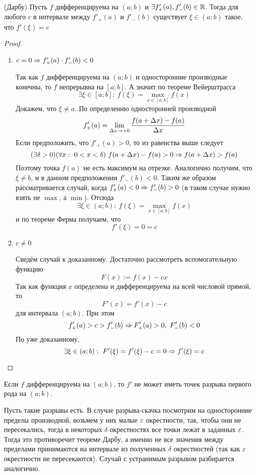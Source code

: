 \begin{theorem} (Дарбу)
	Пусть $f$ дифференцируема на $(a; b)$ и
	$\exists f'_+(a), f'_-(b) \in \mathbb{R}$. Тогда для любого
	$c$ в интервале между $f'_+(a)$ и $f'_-(b)$ существует
	$\xi \in (a; b)$ такое, что $f'(\xi) = c$
\end{theorem}

\begin{proof}~
	\begin{enumerate}
		\item $c = 0 \Rightarrow f'_+(a) \cdot f'_-(b) < 0$
		
		Так как $f$ дифференцируема на $(a; b)$ и
		односторонние производные конечны, то $f$
		непрерывна на $[a; b]$. А значит по теореме Вейерштрасса
		\[
			\exists \xi \in [a; b] :\ f(\xi) =
			\max\limits_{x \in [a; b]} f(x)
		\]
		Докажем, что $\xi \neq a$. По определению
		односторонней производной
		\[
			f'_+(a) = \lim\limits_{\Delta x \to +0}
			\frac{f(a + \Delta x) - f(a)}{\Delta x}
		\]
		Если предположить, что $f'_+(a) > 0$, то из равенства выше следует
		\[
			(\exists \delta > 0)(\forall x :\ 0 < x < \delta)\ 
			f(a + \Delta x) - f(a) > 0 \Ra f(a + \Delta x) > f(a)
		\]
		Поэтому точка $f(a)$
		не есть максимум на отрезке. Аналогично получим, что
		$\xi \neq b$, и в данном предположении $f'_-(b) < 0$.
		Таким же образом рассматривается случай, когда
		$f'_+(a) < 0 \Rightarrow f'_-(b) > 0$ (в таком случае нужно
		взять не $\max$, а $\min$). Отсюда
		\[
			\exists \xi \in (a; b) :\ f(\xi) = \max\limits_{x \in [a; b]} f(x)
		\]
		и по теореме Ферма получаем, что
		\[
			f'(\xi) = 0 = c
		\]
		
		\item $c \neq 0$
		
		Сведём случай к доказанному. Достаточно
		рассмотреть вспомогательную функцию
		\[
			F(x) := f(x) - cx
		\]
		Так как функция $x$ определена и дифференцируема
		на всей числовой прямой, то
		\[
			F'(x) = f'(x) - c
		\]
		для интервала $(a; b)$. При этом
		\[
		f'_+(a) > c > f'_-(b) \Rightarrow
		F'_+(a) > 0,\ F'_-(b) < 0
		\]
		По уже доказанному, 
		\[
			\exists \xi \in (a; b) :\ F'(\xi) = f'(\xi) - c =
			0 \Rightarrow f'(\xi) = c
		\]
	\end{enumerate}
\end{proof}

\begin{corollary}
	Если $f$ дифференцируема на $(a; b)$, то $f'$ не
	может иметь точек разрыва первого рода на $(a; b)$.
\end{corollary}

\begin{idea}
	Пусть такие разрывы есть.
	В случае разрыва-скачка посмотрим на односторонние пределы
	производной, возьмем у них малые $\varepsilon$ окрестности, так,
	чтобы они не пересекались, тогда в некоторых $\delta$ окрестностях
	все точки лежат в заданных $\varepsilon$. Тогда это противоречит теореме Дарбу,
	а именно не все значения между пределами принимаются на интервале из полученных
 	$\delta$ окрестностей (так как $\varepsilon$ окрестности не пересекаются).
	Случай с устранимым разрывом разбирается аналогично.
\end{idea}

